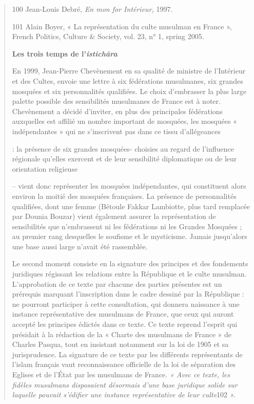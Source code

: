 \begin{quote}
100 Jean-Louis Debré, \emph{En mon for Intérieur,} 1997.

101 Alain Boyer, « La représentation du culte musulman en France »,
French Politics, Culture \& Society, vol. 23, n° 1, spring 2005.



\textbf{Les trois temps de l'\emph{istichâra}}

En 1999, Jean-Pierre Chevènement en sa qualité de ministre de
l'Intérieur et des Cultes, envoie une lettre à six fédérations
musulmanes, six grandes mosquées et six personnalités qualifiées. Le
choix d'embrasser la plus large palette possible des sensibilités
musulmanes de France est à noter. Chevènement a décidé d'inviter, en
plus des principales fédérations auxquelles est affilié un nombre
important de mosquées, les mosquées « indépendantes » qui ne
s'inscrivent pas dans ce tissu d'allégeances

: la présence de six grandes mosquées- choisies au regard de l'influence
régionale qu'elles exercent et de leur sensibilité diplomatique ou de
leur orientation religieuse

-- vient donc représenter les mosquées indépendantes, qui constituent
alors environ la moitié des mosquées françaises. La présence de
personnalités qualifiées, dont une femme (Bétoule Fakkar Lambiotte, plus
tard remplacée par Dounia Bouzar) vient également assurer la
représentation de sensibilités que n'embrassent ni les fédérations ni
les Grandes Mosquées ; au premier rang desquelles le soufisme et le
mysticisme. Jamais jusqu'alors une base aussi large n'avait été
rassemblée.

Le second moment consiste en la signature des principes et des
fondements juridiques régissant les relations entre la République et le
culte musulman. L'approbation de ce texte par chacune des parties
présentes est un prérequis marquant l'inscription dans le cadre dessiné
par la République : ne pourront participer à cette consultation, qui
donnera naissance à une instance représentative des musulmans de France,
que ceux qui auront accepté les principes édictés dans ce texte. Ce
texte reprend l'esprit qui présidait à la rédaction de la « Charte des
musulmans de France » de Charles Pasqua, tout en insistant notamment sur
la loi de 1905 et sa jurisprudence. La signature de ce texte par les
différents représentants de l'islam français vaut reconnaissance
officielle de la loi de séparation des Eglises et de l'État par les
musulmans de France. \emph{« Avec ce texte, les fidèles musulmans
disposaient désormais d'une base juridique solide sur laquelle pouvait
s'édifier une instance représentative de leur culte}102 \emph{».}


\end{quote}
